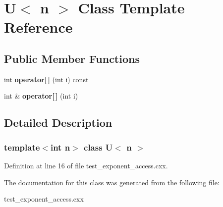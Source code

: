 \hypertarget{class_u}{}\section{U$<$ n $>$ Class Template Reference}
\label{class_u}
\subsection*{Public Member Functions}
\begin{DoxyCompactItemize}
\item 
\hypertarget{class_u_a3605d2b01615c2e96ff9417852bf5c30}{}\label{class_u_a3605d2b01615c2e96ff9417852bf5c30} 
int {\bfseries operator\mbox{[}$\,$\mbox{]}} (int i) const
\item 
\hypertarget{class_u_ad748d4da51eb35ce979cb9a788d0acab}{}\label{class_u_ad748d4da51eb35ce979cb9a788d0acab} 
int \& {\bfseries operator\mbox{[}$\,$\mbox{]}} (int i)
\end{DoxyCompactItemize}


\subsection{Detailed Description}
\subsubsection*{template$<$int n$>$\newline
class U$<$ n $>$}



Definition at line 16 of file test\+\_\+exponent\+\_\+access.\+cxx.



The documentation for this class was generated from the following file\+:\begin{DoxyCompactItemize}
\item 
test\+\_\+exponent\+\_\+access.\+cxx\end{DoxyCompactItemize}
